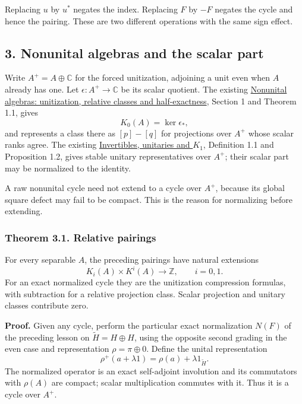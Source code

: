 \documentclass[
  11pt,
]{article}
\begin{document}
Replacing \(u\) by \(u^*\) negates the index. Replacing \(F\) by \(-F\)
negates the cycle and hence the pairing. These are two different
operations with the same sign effect.

\subsection{3. Nonunital algebras and the scalar
part}\label{nonunital-algebras-and-the-scalar-part}

Write \(A^+=A\oplus\mathbb C\) for the forced unitization, adjoining a
unit even when \(A\) already has one. Let \(\epsilon:A^+\to\mathbb C\)
be its scalar quotient. The existing
\href{https://kokunoyumeto.github.io/open-math-courses/courses/KT-OPK/nonunital-algebras-unitization-relative-classes-and-half-exactness.html}{Nonunital
algebras: unitization, relative classes and half-exactness}, Section 1
and Theorem 1.1, gives \[
K_0(A)=\ker\epsilon_*,
\tag{3.1}
\] and represents a class there as \([p]-[q]\) for projections over
\(A^+\) whose scalar ranks agree. The existing
\href{https://kokunoyumeto.github.io/open-math-courses/courses/KT-OPK/invertibles-unitaries-and-k1.html}{Invertibles,
unitaries and \(K_1\)}, Definition 1.1 and Proposition 1.2, gives stable
unitary representatives over \(A^+\); their scalar part may be
normalized to the identity.

A raw nonunital cycle need not extend to a cycle over \(A^+\), because
its global square defect may fail to be compact. This is the reason for
normalizing before extending.

\subsubsection{Theorem 3.1. Relative
pairings}\label{theorem-3.1.-relative-pairings}

For every separable \(A\), the preceding pairings have natural
extensions \[
K_i(A)\times K^i(A)\longrightarrow\mathbb Z,\qquad i=0,1.
\tag{3.2}
\] For an exact normalized cycle they are the unitization compression
formulas, with subtraction for a relative projection class. Scalar
projection and unitary classes contribute zero.

\textbf{Proof.} Given any cycle, perform the particular exact
normalization \(N(F)\) of the preceding lesson on
\(\widetilde H=H\oplus H\), using the opposite second grading in the
even case and representation \(\rho=\pi\oplus0\). Define the unital
representation \[
\rho^+(a+\lambda1)=\rho(a)+\lambda1_{\widetilde H}.
\tag{3.3}
\] The normalized operator is an exact self-adjoint involution and its
commutators with \(\rho(A)\) are compact; scalar multiplication commutes
with it. Thus it is a cycle over \(A^+\).
\end{document}
